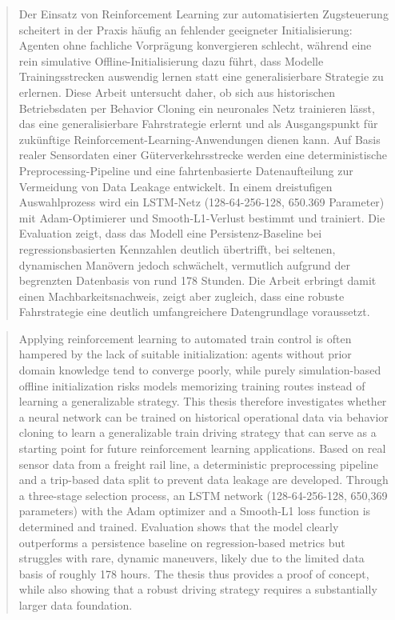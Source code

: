 \begin{abstract}
Der Einsatz von Reinforcement Learning zur automatisierten Zugsteuerung scheitert in der Praxis häufig an fehlender geeigneter Initialisierung: Agenten ohne fachliche Vorprägung konvergieren schlecht, während eine rein simulative Offline-Initialisierung dazu führt, dass Modelle Trainingsstrecken auswendig lernen statt eine generalisierbare Strategie zu erlernen. Diese Arbeit untersucht daher, ob sich aus historischen Betriebsdaten per Behavior Cloning ein neuronales Netz trainieren lässt, das eine generalisierbare Fahrstrategie erlernt und als Ausgangspunkt für zukünftige Reinforcement-Learning-Anwendungen dienen kann. Auf Basis realer Sensordaten einer Güterverkehrsstrecke werden eine deterministische Preprocessing-Pipeline und eine fahrtenbasierte Datenaufteilung zur Vermeidung von Data Leakage entwickelt. In einem dreistufigen Auswahlprozess wird ein LSTM-Netz (128-64-256-128, 650.369 Parameter) mit Adam-Optimierer und Smooth-L1-Verlust bestimmt und trainiert. Die Evaluation zeigt, dass das Modell eine Persistenz-Baseline bei regressionsbasierten Kennzahlen deutlich übertrifft, bei seltenen, dynamischen Manövern jedoch schwächelt, vermutlich aufgrund der begrenzten Datenbasis von rund 178 Stunden. Die Arbeit erbringt damit einen Machbarkeitsnachweis, zeigt aber zugleich, dass eine robuste Fahrstrategie eine deutlich umfangreichere Datengrundlage voraussetzt.
\end{abstract}
\begin{abstract}
Applying reinforcement learning to automated train control is often hampered by the lack of suitable initialization: agents without prior domain knowledge tend to converge poorly, while purely simulation-based offline initialization risks models memorizing training routes instead of learning a generalizable strategy. This thesis therefore investigates whether a neural network can be trained on historical operational data via behavior cloning to learn a generalizable train driving strategy that can serve as a starting point for future reinforcement learning applications. Based on real sensor data from a freight rail line, a deterministic preprocessing pipeline and a trip-based data split to prevent data leakage are developed. Through a three-stage selection process, an LSTM network (128-64-256-128, 650,369 parameters) with the Adam optimizer and a Smooth-L1 loss function is determined and trained. Evaluation shows that the model clearly outperforms a persistence baseline on regression-based metrics but struggles with rare, dynamic maneuvers, likely due to the limited data basis of roughly 178 hours. The thesis thus provides a proof of concept, while also showing that a robust driving strategy requires a substantially larger data foundation.
\end{abstract}

